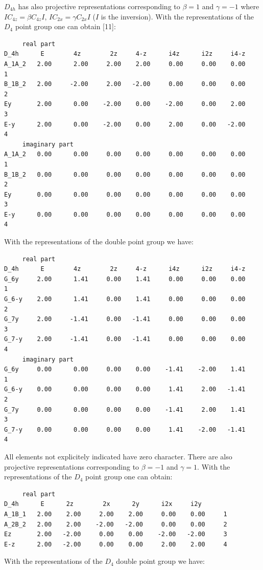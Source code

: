 \documentclass[12pt,a4paper]{article}
\begin{document}
$D_{4h}$ has also projective representations corresponding to
$\beta=1$ and $\gamma=-1$ where $IC_{4z} = \beta C_{4z} I$, 
$IC_{2x} = \gamma C_{2x} I$ ($I$ is the inversion).
With the representations of the $D_4$ point group one can obtain [11]:
\begin{verbatim}
     real part
D_4h      E        4z        2z     4-z      i4z      i2z     i4-z
A_1A_2   2.00      2.00     2.00    2.00     0.00     0.00    0.00    1
B_1B_2   2.00     -2.00     2.00   -2.00     0.00     0.00    0.00    2
Ey       2.00      0.00    -2.00    0.00    -2.00     0.00    2.00    3
E-y      2.00      0.00    -2.00    0.00     2.00     0.00   -2.00    4
     imaginary part
A_1A_2   0.00      0.00     0.00    0.00     0.00     0.00    0.00    1
B_1B_2   0.00      0.00     0.00    0.00     0.00     0.00    0.00    2
Ey       0.00      0.00     0.00    0.00     0.00     0.00    0.00    3
E-y      0.00      0.00     0.00    0.00     0.00     0.00    0.00    4
\end{verbatim}
With the representations of the double point group we have:
\begin{verbatim}
     real part
D_4h      E        4z        2z     4-z      i4z      i2z     i4-z
G_6y     2.00      1.41     0.00    1.41     0.00     0.00    0.00    1
G_6-y    2.00      1.41     0.00    1.41     0.00     0.00    0.00    2
G_7y     2.00     -1.41     0.00   -1.41     0.00     0.00    0.00    3
G_7-y    2.00     -1.41     0.00   -1.41     0.00     0.00    0.00    4
     imaginary part
G_6y     0.00      0.00     0.00    0.00    -1.41    -2.00    1.41    1
G_6-y    0.00      0.00     0.00    0.00     1.41     2.00   -1.41    2
G_7y     0.00      0.00     0.00    0.00    -1.41     2.00    1.41    3
G_7-y    0.00      0.00     0.00    0.00     1.41    -2.00   -1.41    4
\end{verbatim}
All elements not explicitely indicated have zero character.
There are also projective representations corresponding to $\beta=-1$ 
and $\gamma=1$. With the representations of the $D_4$ point group one
can obtain:  
\begin{verbatim}
     real part
D_4h      E      2z        2x      2y      i2x     i2y
A_1B_1   2.00    2.00     2.00    2.00     0.00    0.00     1 
A_2B_2   2.00    2.00    -2.00   -2.00     0.00    0.00     2
Ez       2.00   -2.00     0.00    0.00    -2.00   -2.00     3
E-z      2.00   -2.00     0.00    0.00     2.00    2.00     4
\end{verbatim}
With the representations of the $D_4$ double point group we have:  
\end{document}
